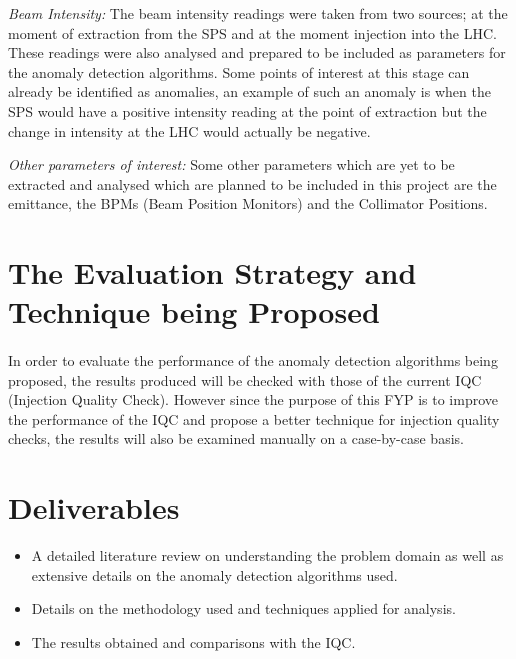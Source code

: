 \documentclass[12pt, twoside]{report}
\begin{document}
	\par \textit{Beam Intensity:} The beam intensity readings were taken from two sources; at the moment of extraction from the SPS and at the moment injection into the LHC. These readings were also analysed and prepared to be included as parameters for the anomaly detection algorithms. Some points of interest at this stage can already be identified as anomalies, an example of such an anomaly is when the SPS would have a positive intensity reading at the point of extraction but the change in intensity at the LHC would actually be negative.
	
	\par \textit{Other parameters of interest:} Some other parameters which are yet to be extracted and analysed which are planned to be included in this project are the emittance, the BPMs (Beam Position Monitors) and the Collimator Positions. 
	
	\section{The Evaluation Strategy and Technique being Proposed}
	
	\paragraph{ } In order to evaluate the performance of the anomaly detection algorithms being proposed, the results produced will be checked with those of the current IQC (Injection Quality Check). However since the purpose of this FYP is to improve the performance of the IQC and propose a better technique for injection quality checks, the results will also be examined manually on a case-by-case basis.
	
	\section{Deliverables}
	\begin{itemize}
		\item A detailed literature review on understanding the problem domain as well as extensive details on the anomaly detection algorithms used.
		\item Details on the methodology used and techniques applied for analysis.
		\item The results obtained and comparisons with the IQC.
	\end{itemize}
	
\end{document}

